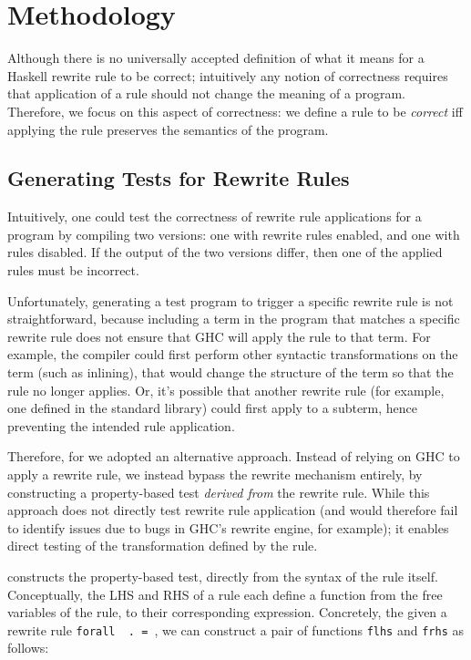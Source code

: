 \section{Methodology}
\label{sec:methodology}

Although there is no universally accepted definition of what it means for a
Haskell rewrite rule to be correct; intuitively any notion of correctness
requires that application of a rule should not change the meaning of a program.
Therefore, we focus on this aspect of correctness: we define a rule to be
\textit{correct} iff applying the rule preserves the semantics of the program.

\subsection{Generating Tests for Rewrite Rules}

Intuitively, one could test the correctness of rewrite rule applications for a
program by compiling two versions: one with rewrite rules enabled, and one with
rules disabled. If the output of the two versions differ, then one of the
applied rules must be incorrect.

Unfortunately, generating a test program to trigger a specific rewrite rule is
not straightforward, because including a term in the program that matches a
specific rewrite rule does not ensure that GHC will apply the rule to that term.
For example, the compiler could first perform other syntactic transformations on
the term (such as inlining), that would change the structure of the term so that
the rule no longer applies. Or, it's possible that another rewrite rule (for
example, one defined in the standard library) could first apply to a subterm,
hence preventing the intended rule application.

Therefore, for \Rulecheck we adopted an alternative approach. Instead of relying
on GHC to apply a rewrite rule, we instead bypass the rewrite mechanism
entirely, by constructing a property-based test \textit{derived from} the
rewrite rule. While this approach does not directly test rewrite rule
application (and would therefore fail to identify issues due to bugs in GHC's
rewrite engine, for example); it enables direct testing of the transformation
defined by the rule.

\Rulecheck constructs the property-based test, directly from the syntax of the
rule itself. Conceptually, the LHS and RHS of a rule each define a function from
the free variables of the rule, to their corresponding expression. Concretely,
the given a rewrite rule \texttt{forall \rbinders~.~\rlhs = \rrhs}, we can
construct a pair of functions \texttt{flhs} and \texttt{frhs} as follows:

